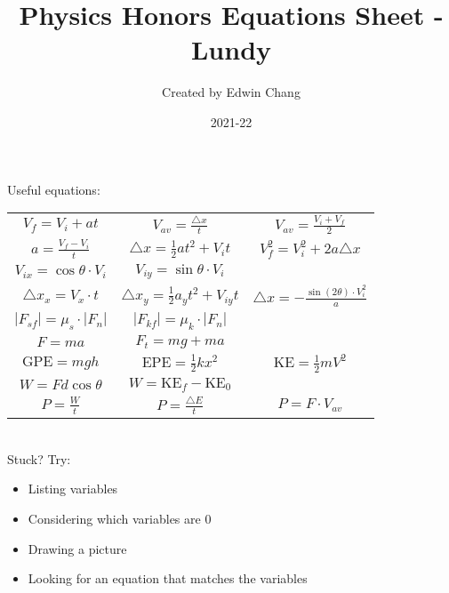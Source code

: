 \documentclass[12pt]{article}
\title{Physics Honors Equations Sheet - Lundy}
\author{Created by Edwin Chang}
\date{2021-22}
\begin{document}

\maketitle

\setlength{\parindent}{0pt} %

Useful equations:
\begin{center}
\begingroup
\setlength{\tabcolsep}{16pt} %
\renewcommand{\arraystretch}{2.25} %
\begin{tabular}{ c c c }
    $V_f = V_i + at$ & $V_{av} = \frac{\triangle x}{t}$ & $V_{av} = \frac{V_i + V_f}{2}$ \\
    $a = \frac{V_f - V_i}{t}$ & $\triangle x = \frac{1}{2}a{t^2} + V_{i}t$ & $V_{f}^{2} = V_{i}^{2} + 2a\triangle x$ \\
    $V_{ix} = \cos{\theta} \cdot V_i$ & $V_{iy} = \sin{\theta} \cdot V_i$ \\
    $\triangle x_x = V_x \cdot t$ & $\triangle x_y = \frac{1}{2} a_{y}{t^2} + V_{iy}t$ & $\triangle x = -\frac{\sin{(2\theta)} \cdot {V_{i}^2}}{a}$ \\
    $|F_{sf}|=\mu_{s}\cdot|F_{n}|$ & $|F_{kf}|=\mu_{k}\cdot|F_{n}|$ \\
    $F=ma$ & $F_t=mg+ma$ \\
    $\text{GPE}=mgh$ & $\text{EPE}=\frac{1}{2}k{x^2}$ & $\text{KE}=\frac{1}{2}m{V^2}$ \\
    $W=Fd\cos{\theta}$ & $W=\text{KE}_{f}-\text{KE}_0$ \\
    $P=\frac{W}{t}$ & $P=\frac{\triangle E}{t}$ & $P=F\cdot{V_{av}}$
\end{tabular}
\endgroup
\end{center}
\ \\
Stuck? Try:
\begin{itemize}
    \item Listing variables
    \item Considering which variables are 0
    \item Drawing a picture
    \item Looking for an equation that matches the variables
\end{itemize}
\end{document}
